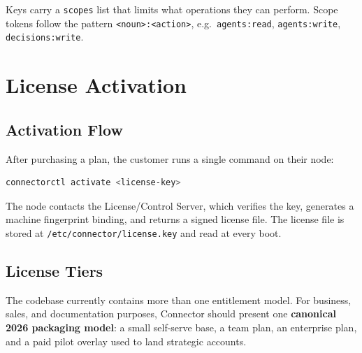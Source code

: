 Keys carry a \texttt{scopes} list that limits what operations they can perform.
Scope tokens follow the pattern \texttt{<noun>:<action>}, e.g.\
\texttt{agents:read}, \texttt{agents:write}, \texttt{decisions:write}.

\section{License Activation}

\subsection{Activation Flow}

After purchasing a plan, the customer runs a single command on their node:

\begin{lstlisting}[language=bash]
connectorctl activate <license-key>
\end{lstlisting}

The node contacts the License/Control Server, which verifies the key, generates
a machine fingerprint binding, and returns a signed license file. The license
file is stored at \texttt{/etc/connector/license.key} and read at every boot.

\subsection{License Tiers}

The codebase currently contains more than one entitlement model. For business,
sales, and documentation purposes, Connector should present one
\textbf{canonical 2026 packaging model}: a small self-serve base, a team plan,
an enterprise plan, and a paid pilot overlay used to land strategic accounts.

